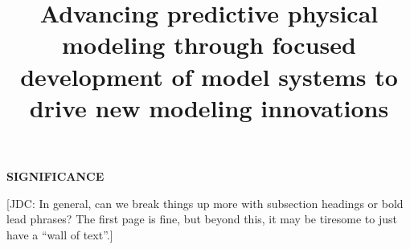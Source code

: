 \documentclass[11pt]{article}
\title{ Advancing predictive physical modeling through focused development of model systems to drive new modeling innovations}
\begin{document}







{\large \bf SIGNIFICANCE}

{\color{red}[JDC: In general, can we break things up more with subsection headings or bold lead phrases? The first page is fine, but beyond this, it may be tiresome to just have a ``wall of text''.]}
\end{document}
